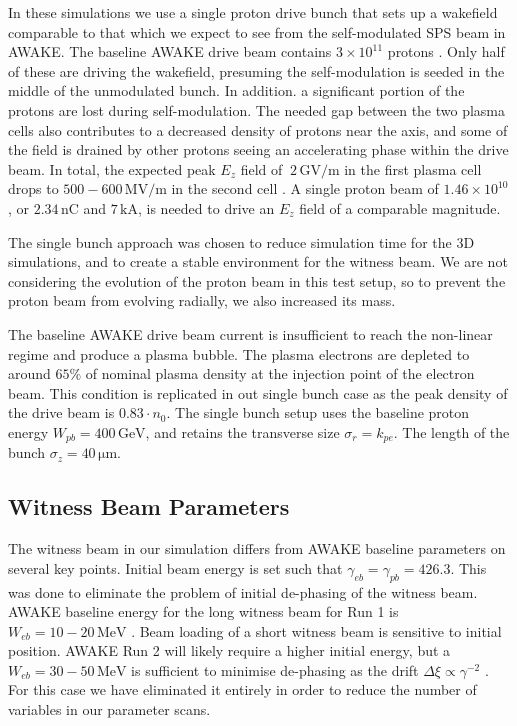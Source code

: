 \documentclass[aps,prstab,reprint,amsmath,amssymb,groupedaddress]{revtex4-1}
\newcommand{\unit}[1]{\,\mathrm{#1}}
\newcommand{\funit}[2]{\,\mathrm{#1}/\mathrm{#2}}
\newcommand{\nexp}[1]{\times 10^{#1}}
\begin{document}
In these simulations we use a single proton drive bunch that sets up a wakefield comparable to that which we expect to
see from the self-modulated SPS beam in AWAKE. The baseline AWAKE drive beam contains $3\nexp{11}$ protons
\cite{gschwendtner:2016}. Only half of these are driving the wakefield, presuming the self-modulation is seeded in the
middle of the unmodulated bunch. In addition. a significant portion of the protons are lost during self-modulation. The
needed gap between the two plasma cells also contributes to a decreased density of protons near the axis, and some of
the field is drained by other protons seeing an accelerating phase within the drive beam. In total, the expected peak
$E_{z}$ field of $~2\funit{GV}{m}$ in the first plasma cell drops to $500-600\funit{MV}{m}$ in the second cell
\cite{awake_collaboration:2016}. A single proton beam of $1.46\nexp{10}$, or $2.34\unit{nC}$ and $7\unit{kA}$, is needed
to drive an $E_{z}$ field of a comparable magnitude.

The single bunch approach was chosen to reduce simulation time for the 3D simulations, and to create a stable
environment for the witness beam. We are not considering the evolution of the proton beam in this test setup, so to
prevent the proton beam from evolving radially, we also increased its mass.

The baseline AWAKE drive beam current is insufficient to reach the non-linear regime and produce a plasma bubble. The
plasma electrons are depleted to around $65\%$ of nominal plasma density at the injection point of the electron beam.
This condition is replicated in out single bunch case as the peak density of the drive beam is $0.83\cdot n_{0}$. The
single bunch setup uses the baseline proton energy $W_{pb} = 400\unit{GeV}$, and retains the transverse size
$\sigma_{r} = k_{pe}$. The length of the bunch $\sigma_{z} = 40\unit{\mu m}$.

\subsection[\label{S:M:Setup}]{Witness Beam Parameters}

The witness beam in our simulation differs from AWAKE baseline parameters on several key points. Initial beam energy is
set such that $\gamma_{eb} = \gamma_{pb} = 426.3$. This was done to eliminate the problem of initial de-phasing of the
witness beam. AWAKE baseline energy for the long witness beam for Run 1 is $W_{eb} = 10-20\unit{MeV}$
\cite{gschwendtner:2016}. Beam loading of a short witness beam is sensitive to initial position. AWAKE Run 2 will likely
require a higher initial energy, but a $W_{eb} = 30-50\unit{MeV}$ is sufficient to minimise de-phasing as the drift
$\Delta\xi \propto \gamma^{-2}$ \cite{berglyd_olsen:2015}. For this case we have eliminated it entirely in order to
reduce the number of variables in our parameter scans.
\end{document}
